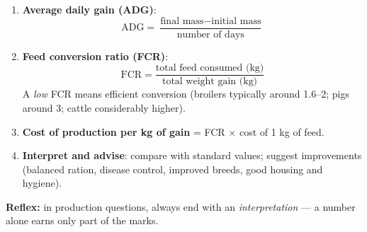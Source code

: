 \documentclass[11pt]{article}
\begin{document}
\begin{methode}
\begin{enumerate}
\item \textbf{Average daily gain (ADG)}:
\[ \text{ADG} = \frac{\text{final mass} - \text{initial mass}}{\text{number of days}} \]
\item \textbf{Feed conversion ratio (FCR)}:
\[ \text{FCR} = \frac{\text{total feed consumed (kg)}}{\text{total weight gain (kg)}} \]
A \emph{low} FCR means efficient conversion (broilers typically around 1.6--2; pigs around 3; cattle considerably higher).
\item \textbf{Cost of production per kg of gain} = FCR $\times$ cost of 1 kg of feed.
\item \textbf{Interpret and advise}: compare with standard values; suggest improvements (balanced ration, disease control, improved breeds, good housing and hygiene).
\end{enumerate}
\textbf{Reflex:} in production questions, always end with an \emph{interpretation} — a number alone earns only part of the marks.
\end{methode}
\end{document}
